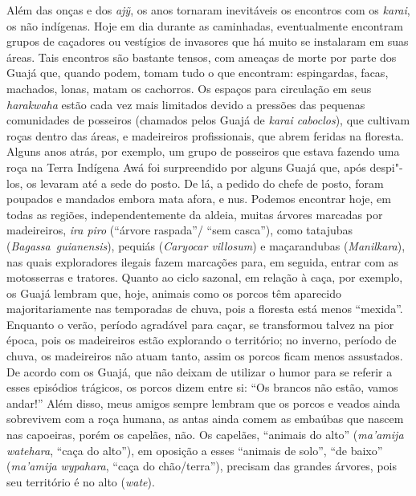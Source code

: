 Além das onças e dos \emph{ajỹ}, os anos tornaram inevitáveis os
encontros com os \emph{karai}, os não indígenas. Hoje em dia durante as
caminhadas, eventualmente encontram grupos de caçadores ou vestígios de
invasores que há muito se instalaram em suas áreas. Tais encontros são
bastante tensos, com ameaças de morte por parte dos Guajá que, quando
podem, tomam tudo o que encontram: espingardas, facas, machados, lonas,
matam os cachorros. Os
espaços para circulação em seus \emph{harakwaha} estão cada vez mais
limitados devido a pressões das pequenas comunidades de posseiros
(chamados pelos Guajá de \emph{karai caboclos}), que cultivam roças
dentro das áreas, e madeireiros profissionais, que abrem feridas na
floresta. Alguns anos atrás, por exemplo, um grupo de posseiros que
estava fazendo uma roça na Terra Indígena Awá foi surpreendido
por alguns Guajá que, após despi"-los, os levaram até a sede do posto. De
lá, a pedido do chefe de posto, foram poupados e mandados embora mata
afora, e nus. Podemos encontrar hoje, em todas as regiões,
independentemente da aldeia, muitas árvores marcadas por madeireiros,
\emph{ira piro} (``árvore raspada''/ ``sem casca''), como tatajubas
(\emph{Bagassa~guianensis}), pequiás (\emph{Caryocar villosum}) e
maçarandubas (\emph{Manilkara}), nas quais exploradores ilegais fazem
marcações para, em seguida, entrar com as motosserras e tratores. Quanto
ao ciclo sazonal, em relação à caça, por exemplo, os Guajá lembram que,
hoje, animais como os porcos têm aparecido majoritariamente nas
temporadas de chuva, pois a floresta está menos ``mexida''. Enquanto o
verão, período agradável para caçar, se transformou talvez na pior
época, pois os madeireiros estão explorando o território; no inverno,
período de chuva, os madeireiros não atuam tanto, assim os porcos ficam
menos assustados. De acordo com os Guajá, que não deixam de utilizar o
humor para se referir a esses episódios trágicos, os porcos dizem entre
si: ``Os brancos não estão, vamos andar!'' Além disso, meus amigos
sempre lembram que os porcos e veados ainda sobrevivem com a roça
humana, as antas ainda comem as embaúbas que nascem nas capoeiras, porém
os capelães, não. Os capelães, ``animais do alto'' (\emph{ma'amija
watehara}, ``caça do alto''), em oposição a esses ``animais de solo'', ``de
baixo'' (\emph{ma'amija} \emph{wypahara}, ``caça do chão/terra''), precisam
das grandes árvores, pois seu território é no alto (\emph{wate}).

